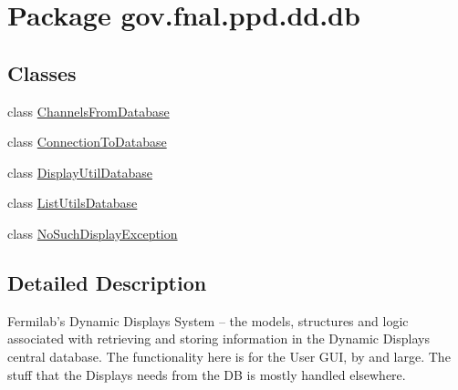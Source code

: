 \hypertarget{namespacegov_1_1fnal_1_1ppd_1_1dd_1_1db}{\section{Package gov.\-fnal.\-ppd.\-dd.\-db}
\label{namespacegov_1_1fnal_1_1ppd_1_1dd_1_1db}
}
\subsection*{Classes}
\begin{DoxyCompactItemize}
\item 
class \hyperlink{classgov_1_1fnal_1_1ppd_1_1dd_1_1db_1_1ChannelsFromDatabase}{Channels\-From\-Database}
\item 
class \hyperlink{classgov_1_1fnal_1_1ppd_1_1dd_1_1db_1_1ConnectionToDatabase}{Connection\-To\-Database}
\item 
class \hyperlink{classgov_1_1fnal_1_1ppd_1_1dd_1_1db_1_1DisplayUtilDatabase}{Display\-Util\-Database}
\item 
class \hyperlink{classgov_1_1fnal_1_1ppd_1_1dd_1_1db_1_1ListUtilsDatabase}{List\-Utils\-Database}
\item 
class \hyperlink{classgov_1_1fnal_1_1ppd_1_1dd_1_1db_1_1NoSuchDisplayException}{No\-Such\-Display\-Exception}
\end{DoxyCompactItemize}


\subsection{Detailed Description}
Fermilab's Dynamic Displays System -- the models, structures and logic associated with retrieving and storing information in the Dynamic Displays central database. The functionality here is for the User G\-U\-I, by and large. The stuff that the Displays needs from the D\-B is mostly handled elsewhere.